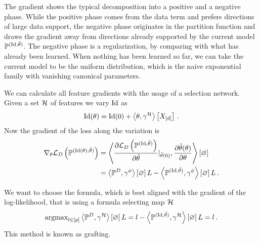 The gradient shows the typical decomposition into a positive and a negative phase.
While the positive phase comes from the data term and prefers directions of large data support, the negative phase originates in the partition function and draws the gradient away from directions already supported by the current model $\mathbb{P}^{(\mathrm{Id}, \tilde{\theta})}$.
The negative phase is a regularization, by comparing with what has already been learned.
When nothing has been learned so far, we can take the current model to be the uniform distribution, which is the naive exponential family with vanishing canonical parameters. 



We can calculate all feature gradients with the usage of a selection network.
Given a set $\mathcal{H}$ of features we vary $\mathrm{Id}$ as
\begin{align*}
	 \naivestat(\canparam) %
	= \naivestat(0) + \sbcontractionof{\canparam,\sencodingof{\fselectionmap}}{\shortcatvariables} \, . 
\end{align*}
Now the gradient of the loss along the variation is
\begin{align*}
	 \nabla_{\theta} \mathcal{L}_{D}\left(\mathbb{P}^{(\mathrm{Id}(\theta), \tilde{\theta})}\right)
	 &= \left\langle 
	 	\frac{\partial\mathcal{L}_{D}\left(\mathbb{P}^{(\mathrm{Id}, \tilde{\theta})}\right)}{\partial\tilde{\theta}}|_{\tilde{\theta}(0)},
		\frac{\partial\tilde{\theta}(\theta)}{\partial\theta} 
	 \right\rangle \left[ \varnothing \right]  \\
	 &= \left\langle \mathbb{P}^{D},\gamma^{\phi}\right\rangle \left[ \varnothing \right]{L} -   \left\langle \mathbb{P}^{(\mathrm{Id}, \tilde{\theta})},\gamma^{\phi}\right\rangle \left[ \varnothing \right]{L} \, . 
\end{align*}



We want to choose the formula, which is best aligned with the gradient of the log-likelihood, that is using a formula selecting map $\mathcal{H}$
\begin{align*}
	\mathrm{argmax}_{l\in[p]} \left\langle \mathbb{P}^{D},\gamma^{\mathcal{H}}\right\rangle \left[ \varnothing \right]{L=l} - \left\langle \mathbb{P}^{(\mathrm{Id}, \tilde{\theta})},\gamma^{\mathcal{H}}\right\rangle \left[ \varnothing \right]{L=l} \, . 
\end{align*}
This method is known as grafting.




